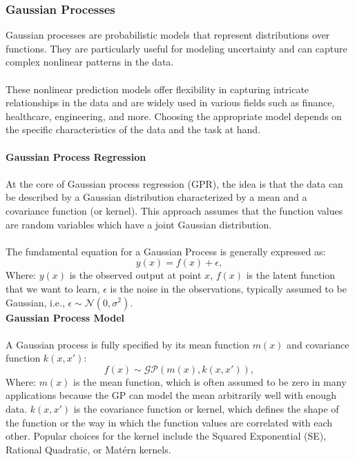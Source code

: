 \documentclass[12pt]{article}
\begin{document}
\subsubsection{Gaussian Processes}
Gaussian processes are probabilistic models that represent distributions over functions.
They are particularly useful for modeling uncertainty and can capture complex nonlinear
patterns in the data.\\
\\
These nonlinear prediction models offer flexibility in capturing intricate relationships
in the data and are widely used in various fields such as finance, healthcare, engineering,
and more. Choosing the appropriate model depends on the specific characteristics of the
data and the task at hand.\\
\\
\textbf{Gaussian Process Regression}\\
\\
At the core of Gaussian process regression (GPR), the idea is that the data can be
described by a Gaussian distribution characterized by a mean and a covariance
function (or kernel). This approach assumes that the function values are random
variables which have a joint Gaussian distribution.\\
\\
The fundamental equation for a Gaussian Process is generally expressed as:
\begin{equation}
    y(x) = f(x) + \epsilon,
\end{equation}
Where:
\( y(x) \) is the observed output at point \( x \),
\( f(x) \) is the latent function that we want to learn,
\( \epsilon \) is the noise in the observations, typically assumed to be Gaussian, i.e., \( \epsilon \sim \mathcal{N}(0, \sigma^2) \).\\
\newpage
\noindent \textbf{Gaussian Process Model}\\
\\
A Gaussian process is fully specified by its mean function \( m(x) \) and covariance
function \( k(x, x') \):
\begin{equation}
    f(x) \sim \mathcal{GP}(m(x), k(x, x')),
\end{equation}
Where:
\( m(x) \) is the mean function, which is often assumed to be zero in many applications because the GP can model the mean arbitrarily well with enough data.
\( k(x, x') \) is the covariance function or kernel, which defines the shape of the function or the way in which the function values are correlated with each other. Popular choices for the kernel include the Squared Exponential (SE), Rational Quadratic, or Matérn kernels.\\
\end{document}
